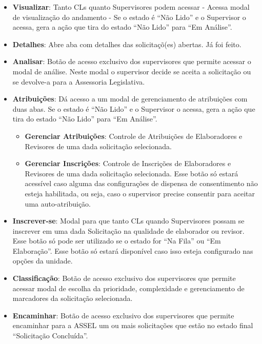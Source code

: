 	\begin{itemize}
		\item \textbf{Visualizar}: Tanto CLs quanto Supervisores podem acessar - Acessa modal de visualização do andamento - Se o estado é ``Não Lido'' e o Supervisor o acessa, gera a ação que tira do estado ``Não Lido'' para ``Em Análise''.
	
		\item \textbf{Detalhes}: Abre aba com detalhes das solicitaçõ(es) abertas. Já foi feito.

		\item \textbf{Analisar}: Botão de acesso exclusivo dos supervisores que permite acessar o modal de análise. Neste modal o supervisor decide se aceita a solicitação ou se devolve-a para a Assessoria Legislativa.
	
		\item \textbf{Atribuições}: Dá acesso a um modal de gerenciamento de atribuições com duas abas. 	Se o estado é ``Não Lido'' e o Supervisor o acessa, gera a ação que tira do estado ``Não Lido'' para ``Em Análise''.	
		
		\begin{itemize}
			\item \textbf{Gerenciar Atribuições}: Controle de Atribuições de Elaboradores e Revisores de uma dada solicitação selecionada. 

			\item \textbf{Gerenciar Inscrições}: Controle de Inscrições de Elaboradores e Revisores de uma dada solicitação selecionada. Esse botão só estará acessível caso alguma das configurações de dispensa de consentimento não esteja habilitada, ou seja, caso o supervisor precise consentir para aceitar uma  auto-atribuição. 
		\end{itemize}

	
		\item \textbf{Inscrever-se}: Modal para que tanto CLs quando Supervisores possam se inscrever em uma dada Solicitação na qualidade de elaborador ou revisor. Esse botão só pode ser utilizado se o estado for ``Na Fila'' ou ``Em Elaboração''. Esse botão só estará disponível caso isso esteja configurado nas opções da unidade. 
	
		\item \textbf{Classificação}: Botão de acesso exclusivo dos supervisores que permite acessar modal de escolha da prioridade, complexidade e gerenciamento de marcadores da solicitação selecionada.
	
		\item \textbf{Encaminhar}: Botão de acesso exclusivo dos supervisores que permite encaminhar para a ASSEL um ou mais solicitações que estão no estado final ``Solicitação Concluída''.		
	\end{itemize}
	
